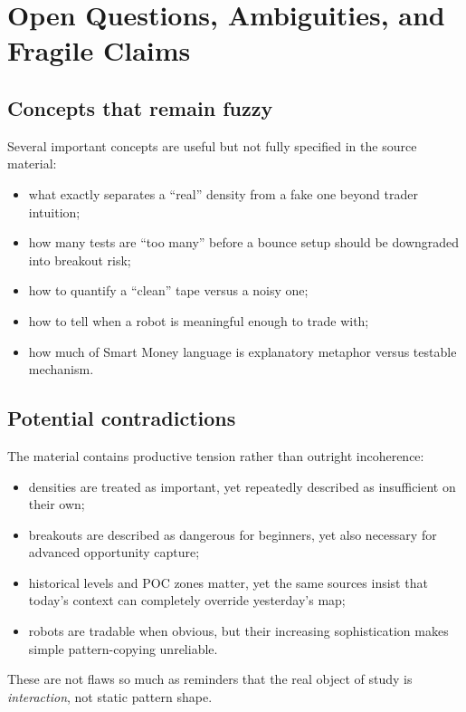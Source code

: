\section{Open Questions, Ambiguities, and Fragile Claims}

\subsection{Concepts that remain fuzzy}

Several important concepts are useful but not fully specified in the source material:

\begin{itemize}[leftmargin=1.5em]
\item what exactly separates a ``real'' density from a fake one beyond trader intuition;
\item how many tests are ``too many'' before a bounce setup should be downgraded into breakout risk;
\item how to quantify a ``clean'' tape versus a noisy one;
\item how to tell when a robot is meaningful enough to trade with;
\item how much of Smart Money language is explanatory metaphor versus testable mechanism.
\end{itemize}

\subsection{Potential contradictions}

The material contains productive tension rather than outright incoherence:

\begin{itemize}[leftmargin=1.5em]
\item densities are treated as important, yet repeatedly described as insufficient on their own;
\item breakouts are described as dangerous for beginners, yet also necessary for advanced opportunity capture;
\item historical levels and POC zones matter, yet the same sources insist that today's context can completely override yesterday's map;
\item robots are tradable when obvious, but their increasing sophistication makes simple pattern-copying unreliable.
\end{itemize}

These are not flaws so much as reminders that the real object of study is \emph{interaction}, not static pattern shape.

